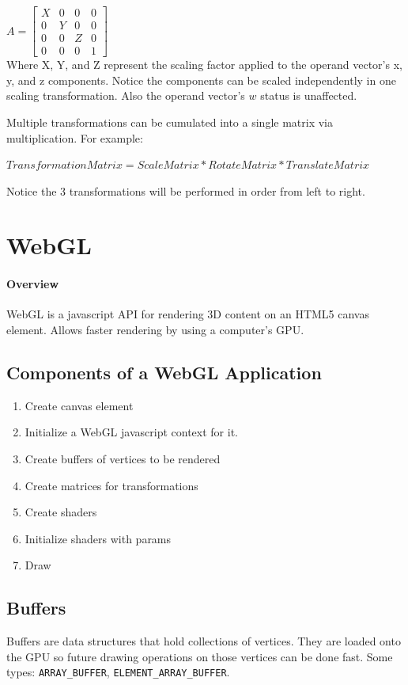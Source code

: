 \documentclass[12pt]{article}
\begin{document}
$ A = \begin{bmatrix}
X & 0 & 0 & 0 \\
0 & Y & 0 & 0 \\
0 & 0 & Z & 0 \\
0 & 0 & 0 & 1
\end{bmatrix}$ \\

Where X, Y, and Z represent the scaling factor applied to the operand vector's
x, y, and z components. Notice the components can be scaled independently
in one scaling transformation. Also the operand vector's $w$ status is
unaffected.


Multiple transformations can be cumulated into a single matrix via multiplication.
For example: 

$TransformationMatrix = ScaleMatrix * RotateMatrix * TranslateMatrix$

Notice the 3 transformations will be performed in order from left to right.

\section{WebGL}

\paragraph{Overview} WebGL is a javascript API for rendering 3D content on an
HTML5 canvas element. Allows faster rendering by using a computer's GPU.

\subsection{Components of a WebGL Application}
\begin{enumerate}
	\item Create canvas element
	\item Initialize a WebGL javascript context for it.
	\item Create buffers of vertices to be rendered
	\item Create matrices for transformations
	\item Create shaders
	\item Initialize shaders with params
	\item Draw 
\end{enumerate}
\cite{upandrunning}

\subsection{Buffers}
Buffers are data structures that hold collections of vertices. They are loaded
onto the GPU so future drawing operations on those vertices can be done fast.
Some types: \verb|ARRAY_BUFFER|,  \verb|ELEMENT_ARRAY_BUFFER|.
\end{document}
